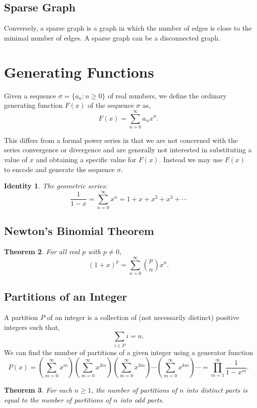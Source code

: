 \documentclass{article}
\newtheorem{theorem}{Theorem}[section]
\newtheorem{identity}[theorem]{Identity}
\begin{document}
\subsection{Sparse Graph}
Conversely, a sparse graph is a graph in which the number of edges is close to the minimal number of edges. A sparse graph can be a disconnected graph.

\section{Generating Functions}
Given a sequence $\sigma=\{a_n:n\ge0\}$ of real numbers, we define the ordinary generating function $F(x)$ of the sequence $\sigma$ as,
\[
F(x)=\sum_{n=0}^\infty a_n x^n.
\]

This differs from a formal power series in that we are not concerned with the series convergence or divergence and are generally not interested in substituting a value of $x$ and obtaining a specific value for $F(x)$. Instead we may use $F(x)$ to encode and generate the sequence $\sigma$.


\begin{identity} The geometric series:
\[
\frac {1}{1-x}=\sum _{n=0}^{\infty }x^{n}=1+x+x^{2}+x^{3}+\cdots
\]
\end{identity}

\subsection{Newton's Binomial Theorem}
\begin{theorem}
For all real $p$ with $p\neq 0$, 
\[
(1+x)^p=\sum_{n=0}^\infty\binom{p}{n}x^n.
\]
\end{theorem}

\subsection{Partitions of an Integer}
A partition $P$ of an integer is a collection of (not necessarily distinct) positive integers such that,
\[
\sum_{i\in P} i = n.
\]
We can find the number of partitions of a given integer using a generator function
\[
P(x) = \left(\sum_{m=0}^\infty x^{m}\right)\left(\sum_{m=0}^\infty x^{2m}\right)         \left(\sum_{m=0}^\infty x^{3m}\right)\cdots         \left(\sum_{m=0}^\infty x^{km}\right)\cdots = \prod_{m=1}^\infty\frac{1}{1-x^m}.
\]
\begin{theorem}
For each $n\geq 1$, the number of partitions of $n$ into distinct parts is equal to the number of partitions of $n$ into odd parts.
\end{theorem}
\end{document}

